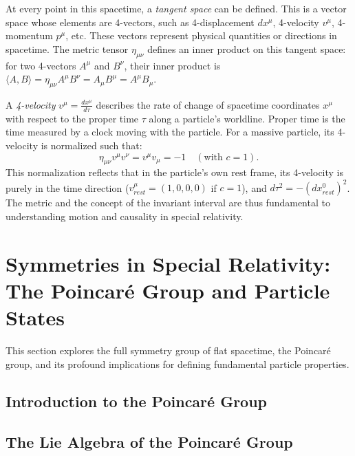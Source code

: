 \documentclass{amsart}
\theoremstyle{definition}
\theoremstyle{remark}
\begin{document}
At every point in this spacetime, a \emph{tangent space} can be defined. This is a vector space whose elements are 4-vectors, such as 4-displacement $dx^\mu$, 4-velocity $v^\mu$, 4-momentum $p^\mu$, etc. These vectors represent physical quantities or directions in spacetime. The metric tensor $\eta_{\mu\nu}$ defines an inner product on this tangent space: for two 4-vectors $A^\mu$ and $B^\nu$, their inner product is $\langle A, B \rangle = \eta_{\mu\nu} A^\mu B^\nu = A_\mu B^\mu = A^\mu B_\mu$.

A \emph{4-velocity} $v^\mu = \frac{dx^\mu}{d\tau}$ describes the rate of change of spacetime coordinates $x^\mu$ with respect to the proper time $\tau$ along a particle's worldline. Proper time is the time measured by a clock moving with the particle. For a massive particle, its 4-velocity is normalized such that:
\begin{equation*}
  \eta_{\mu\nu} v^\mu v^\nu = v^\mu v_\mu = -1 \quad (\text{with } c=1).
\end{equation*}
This normalization reflects that in the particle's own rest frame, its 4-velocity is purely in the time direction ($v^\mu_{rest} = (1,0,0,0)$ if $c=1$), and $d\tau^2 = -(dx^0_{rest})^2$. The metric and the concept of the invariant interval are thus fundamental to understanding motion and causality in special relativity.

\section{Symmetries in Special Relativity: The Poincaré Group and Particle States}
\label{sec:poincare_particle_states}

This section explores the full symmetry group of flat spacetime, the Poincaré group, and its profound implications for defining fundamental particle properties.

\subsection{Introduction to the Poincaré Group}
\label{subsec:intro_poincare}

\subsection{The Lie Algebra of the Poincaré Group}
\label{subsec:poincare_algebra}
\end{document}
